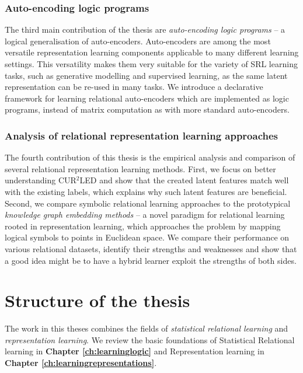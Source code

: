 \subsubsection{Auto-encoding logic programs}

The third main contribution of the thesis are \textit{auto-encoding logic programs} \cite{Dumancic2018a,AlpsSubmitted} -- a logical generalisation of auto-encoders.
Auto-encoders are among the most versatile representation learning components applicable to many different learning settings.
This versatility makes them very suitable for the variety of SRL learning tasks, such as generative modelling and supervised learning, as the same latent representation can be re-used in many tasks.
We introduce a declarative framework for learning relational auto-encoders which are implemented as logic programs, instead of matrix computation as with more standard auto-encoders.






\subsubsection{Analysis of relational representation learning approaches}

The fourth contribution of this thesis is the empirical analysis and comparison of several relational representation learning methods.
First, we focus on better understanding CUR$^2$LED and show that the created latent features match well with the existing labels, which explains why such latent features are beneficial.
Second, we compare symbolic relational learning approaches to the prototypical \textit{knowledge graph embedding methods} -- a novel paradigm for relational learning rooted in representation learning, which approaches the problem by mapping logical symbols to points in Euclidean space.
We compare their performance on various relational datasets, identify their strengths and weaknesses and show that a good idea might be to have a hybrid learner exploit the strengths of both sides.








\section{Structure of the thesis}


The work in this theses combines the fields of \textit{statistical relational learning} and \textit{representation learning}.
We review the basic foundations of Statistical Relational learning in \textbf{Chapter \ref{ch:learninglogic}} and Representation learning in \textbf{Chapter \ref{ch:learningrepresentations}}.


